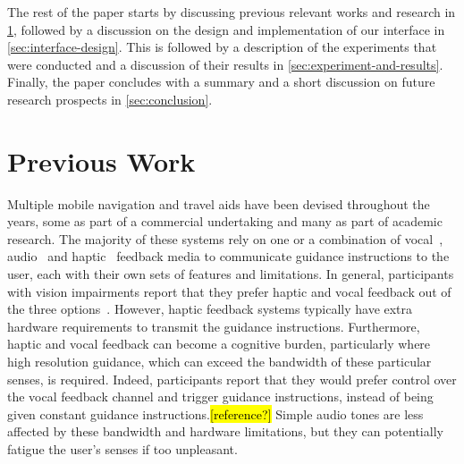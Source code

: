 \documentclass{llncs}
\DeclareRobustCommand{\tofix}[1]{{\sethlcolor{yellow}\hl{[#1]}}}
\begin{document}
The rest of the paper starts by discussing previous relevant works and research in \cref{sec:prev-work}, followed by a discussion on the design and implementation of our interface in \cref{sec:interface-design}.
This is followed by a description of the experiments that were conducted and a discussion of their results in \cref{sec:experiment-and-results}.
Finally, the paper concludes with a summary and a short discussion on future research prospects in \cref{sec:conclusion}.

\section{Previous Work}\label{sec:prev-work}

Multiple mobile navigation and travel aids have been devised throughout the years, some as part of a commercial undertaking and many as part of academic research.
The majority of these systems rely on one or a combination of vocal~\cite{mocanu2016when,chessa2016integrated,kanwal2015navigation}, audio~\cite{schwarze2015intuitive,rodriguez2012obstacle,katz2010navig} and haptic~\cite{rivera-rubio2015assistive,lee2015rgb,xiao2015assistive} feedback media to communicate guidance instructions to the user, each with their own sets of features and limitations.
In general, participants with vision impairments report that they prefer haptic and vocal feedback out of the three options~\cite{arditi2013user}.
However, haptic feedback systems typically have extra hardware requirements to transmit the guidance instructions.
Furthermore, haptic and vocal feedback can become a cognitive burden, particularly where high resolution guidance, which can exceed the bandwidth of these particular senses, is required.
Indeed, participants report that they would prefer control over the vocal feedback channel and trigger guidance instructions, instead of being given constant guidance instructions.\tofix{reference?}
Simple audio tones are less affected by these bandwidth and hardware limitations, but they can potentially fatigue the user's senses if too unpleasant.
\end{document}
